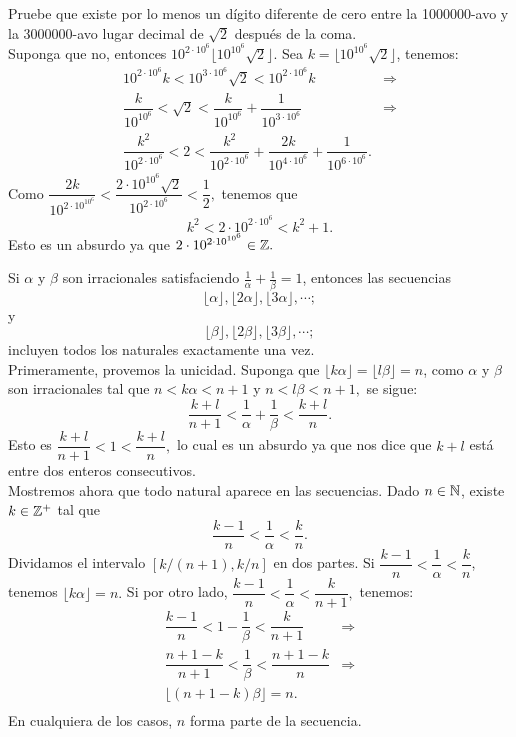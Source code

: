 	\begin{ej}[OBM 1999]
		Pruebe que existe por lo menos un d\'igito diferente de cero entre la 1000000-avo y la 3000000-avo lugar decimal de $\sqrt{2}$ despu\'es de la coma.\\
		
		Suponga que no, entonces $10^{2 \cdot 10^{6}} \lfloor 10^{10^{6}}\sqrt{2} \rfloor$. Sea $k = \lfloor 10^{10^{6}} \sqrt{2} \rfloor$, tenemos:
		\begin{align*}
			10^{2\cdot 10^{6}}k < 10^{3\cdot 10^{6}}\sqrt{2} < 10^{2\cdot 10^{6}}k &\Rightarrow\\
			\dfrac{k}{10^{10^{6}}} < \sqrt{2} < \dfrac{k}{10^{10^{6}}} + \dfrac{1}{10^{3\cdot 10^{6}}} &\Rightarrow\\
			\dfrac{k^{2}}{10^{2\cdot 10^{6}}} < 2 < \dfrac{k^{2}}{10^{2\cdot 10^{6}}} + \dfrac{2k}{10^{4 \cdot 10^{6}}} + \dfrac{1}{10^{6\cdot 10^{6}}}.
		\end{align*}
		Como $\dfrac{2k}{10^{2\cdot 10^{10^{6}}}} < \dfrac{2\cdot 10^{10^{6}}\sqrt{2}} {10^{2\cdot 10^{6}}} < \dfrac{1}{2},$ tenemos que
		$$k^{2} < 2\cdot 10 ^{2\cdot 10^{6}} < k^{2} + 1.$$
		Esto es un absurdo ya que $2\cdot 10^{2\cdot 10^{10^{6}}} \in \mathbb{Z}.$ 
	\end{ej}
	\begin{ej}
		Si $\alpha$ y $\beta$ son irracionales satisfaciendo $\frac{1}{\alpha} + \frac{1}{\beta} = 1$, entonces las secuencias
		$$\lfloor \alpha \rfloor, \lfloor 2\alpha \rfloor, \lfloor 3\alpha \rfloor, \cdots;$$
		y
		$$\lfloor \beta \rfloor, \lfloor 2\beta \rfloor, \lfloor 3\beta \rfloor, \cdots;$$
		incluyen todos los naturales exactamente una vez.\\
		
		Primeramente, provemos la unicidad. Suponga que $\lfloor k\alpha \rfloor = \lfloor l\beta \rfloor = n$, como $\alpha$ y $\beta$ son irracionales tal que $n < k\alpha < n + 1$ y $n < l\beta < n+1,$ se sigue:
		$$\dfrac{k + l}{n+1} < \dfrac{1}{\alpha} + \dfrac{1}{\beta} < \dfrac{k + l}{n}.$$
		Esto es $\dfrac{k + l}{n+1} < 1 < \dfrac{k + l}{n},$ lo cual es un absurdo ya que nos dice que $k + l$ est\'a entre dos enteros consecutivos.\\
		
		Mostremos ahora que todo natural aparece en las secuencias. Dado $n \in \mathbb{N}$, existe $k \in \mathbb{Z}^{+}$ tal que
		$$\dfrac{k - 1}{n} < \dfrac{1}{\alpha} < \dfrac{k}{n}.$$
		Dividamos el intervalo $[k/(n+1), k/n]$ en dos partes. Si $\dfrac{k-1}{n} < \dfrac{1}{\alpha} < \dfrac{k}{n}$, tenemos $\lfloor k\alpha \rfloor = n.$ Si por otro lado, $\dfrac{k - 1}{n} < \dfrac{1}{\alpha} < \dfrac{k}{n + 1},$ tenemos: 
		\begin{align*}
			\dfrac{k - 1}{n} < 1 - \dfrac{1}{\beta} < \dfrac{k}{n + 1} &\Rightarrow\\
			\dfrac{n + 1 - k}{n + 1} < \dfrac{1}{\beta} < \dfrac{n + 1 -k}{n} &\Rightarrow\\
			\lfloor (n + 1 - k)\beta\rfloor = n.\\
		\end{align*}
		En cualquiera de los casos, $n$ forma parte de la secuencia.
	\end{ej}